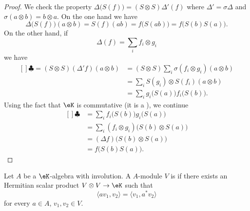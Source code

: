 \begin{proof}
    We check the property \( \Delta\big( S(f) \big)=(S\otimes S)\Delta'(f)\) where \( \Delta'=\sigma\Delta\) and \( \sigma(a\otimes b)=b\otimes a\). On the one hand we have
    \begin{equation}
        \Delta\big( S(f) \big)(a\otimes b)=S(f)(ab)=f\big( S(ab) \big)=f\big( S(b)S(a) \big).
    \end{equation}
    On the other hand, if
    \begin{equation}
        \Delta(f)=\sum_i f_i\otimes g_i
    \end{equation}
    we have
    \begin{equation}
        \begin{aligned}[]
            \clubsuit=(S\otimes S)(\Delta'f)(a\otimes b)&=(S\otimes S)\sum_i\sigma(f_i\otimes g_i)(a\otimes b)\\
            &=\sum_iS(g_i)\otimes S(f_i)(a\otimes b)\\
            &=\sum_i g_i\big( S(a) \big)f_i\big( S(b) \big).
        \end{aligned}
    \end{equation}
    Using the fact that \( \eK\) is commutative (it is a ), we continue
    \begin{equation}
        \begin{aligned}[]
            \clubsuit&=\sum_i f_i\big( S(b) \big)g_i\big( S(a) \big)\\
            &=\sum_i(f_i\otimes g_i)\big( S(b)\otimes S(a) \big)\\
            &=(\Delta f)\big( S(b)\otimes S(a) \big)\\
            &=f\big( S(b)S(a) \big).
        \end{aligned}
    \end{equation}
\end{proof}

\begin{definition}      \label{DefInvolutionHopf}
    Let \( A\) be a \( \eK\)-algebra with involution. A \( A\)-module \( V\) is  if there exists an Hermitian scalar product \( V\otimes V\to\eK\) such that
    \begin{equation}
        \langle av_1, v_2\rangle =\langle v_1, a^*v_2\rangle 
    \end{equation}
    for every \( a\in A\), \( v_1,v_2\in V\).
\end{definition}

